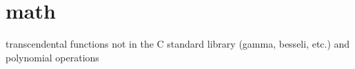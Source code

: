 % 
%

\section{math}
\label{module:math}
transcendental functions not in the C standard library (gamma, besseli, etc.)
and polynomial operations


